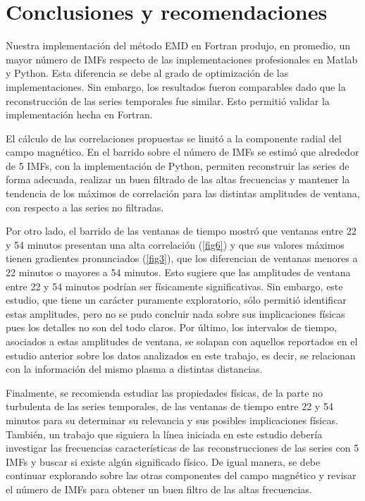 \section{Conclusiones y recomendaciones}

\noindent Nuestra implementación del método EMD en Fortran produjo, en promedio, un mayor número de IMFs respecto de las implementaciones profesionales en Matlab y Python. Esta diferencia se debe al grado de optimización de las implementaciones. Sin embargo, los resultados fueron comparables dado que la reconstrucción de las series temporales fue similar. Esto permitió validar la implementación hecha en Fortran. 

El cálculo de las correlaciones propuestas se limitó a la componente radial del campo magnético. En el barrido sobre el número de IMFs se estimó que alrededor de 5 IMFs, con la implementación de Python, permiten reconstruir las series de forma adecuada, realizar un buen filtrado de las altas frecuencias y mantener la tendencia de los máximos de correlación para las distintas amplitudes de ventana, con respecto a las series no filtradas.     

Por otro lado, el barrido de las ventanas de tiempo mostró que ventanas entre 22 y 54 minutos presentan una alta correlación (\ref{fig6}) y que sus valores máximos tienen gradientes pronunciados (\ref{fig3}), que los diferencian de ventanas menores a 22 minutos o mayores a 54 minutos. Esto sugiere que las amplitudes de ventana entre 22 y 54 minutos podrían ser físicamente significativas. Sin embargo, este estudio, que tiene un carácter puramente exploratorio, sólo permitió identificar estas amplitudes, pero no se pudo concluir nada sobre sus implicaciones físicas pues los detalles no son del todo claros. Por último, los intervalos de tiempo, asociados a estas amplitudes de ventana, se solapan con aquellos reportados en el estudio anterior \cite{telloni_evolution_2021} sobre los datos analizados en este trabajo, es decir, se relacionan con la información del mismo plasma a distintas distancias.

Finalmente, se recomienda estudiar las propiedades físicas, de la parte no turbulenta de las series temporales, de las ventanas de tiempo entre 22 y 54 minutos para su determinar su relevancia y sus posibles implicaciones físicas. También, un trabajo que siguiera la línea iniciada en este estudio debería investigar las frecuencias características de las reconstrucciones de las series con 5 IMFs y buscar si existe algún significado físico. De igual manera, se debe continuar explorando sobre las otras componentes del campo magnético y revisar el número de IMFs para obtener un buen filtro de las altas frecuencias. 

